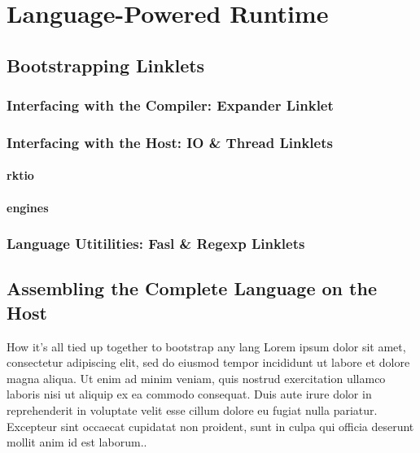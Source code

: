 \chapter{Language-Powered Runtime}
	\section{Bootstrapping Linklets}

	\subsection{Interfacing with the Compiler: Expander Linklet}

	\subsection{Interfacing with the Host: IO \& Thread Linklets}
	\subsubsection{rktio}
	\subsubsection{engines}

	\subsection{Language Utitilities: Fasl \& Regexp Linklets}

	\section{Assembling the Complete Language on the Host} 

	How it's all tied up together to bootstrap any lang
Lorem ipsum dolor sit amet, consectetur adipiscing elit, sed do eiusmod tempor incididunt ut labore et dolore magna aliqua. Ut enim ad minim veniam, quis nostrud exercitation ullamco laboris nisi ut aliquip ex ea commodo consequat. Duis aute irure dolor in reprehenderit in voluptate velit esse cillum dolore eu fugiat nulla pariatur. Excepteur sint occaecat cupidatat non proident, sunt in culpa qui officia deserunt mollit anim id est laborum..
